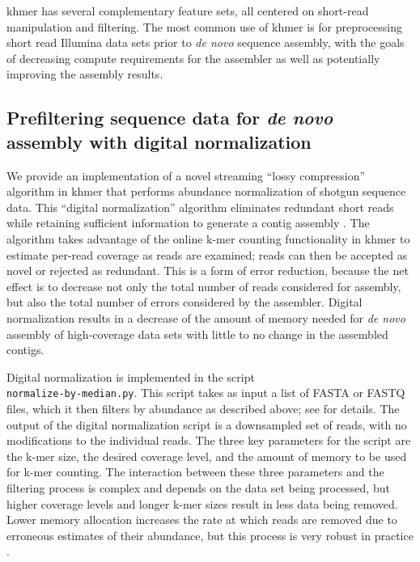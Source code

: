 \documentclass[10pt,a4paper]{article}
\begin{document}
khmer has several complementary feature sets, all centered on short-read
manipulation and filtering.  The most common use of khmer is for preprocessing
short read Illumina data sets prior to {\em de novo} sequence assembly, with the
goals of decreasing compute requirements for the assembler as well as potentially
improving the assembly results.

\subsection*{Prefiltering sequence data for {\em de novo} assembly with digital normalization}

We  provide an implementation of a novel streaming ``lossy compression'' algorithm in
khmer that performs abundance normalization of shotgun sequence data.
This ``digital normalization'' algorithm eliminates redundant
short reads while retaining sufficient information to generate a
contig assembly \cite{Brown2012}.  The algorithm takes advantage of the online
k-mer counting functionality in khmer to estimate per-read coverage as
reads are examined; reads can then be accepted as novel or rejected as
redundant. This is a form of error reduction, because the
net effect is to decrease not only the total number of reads considered
for assembly, but also the total number of errors considered
by the assembler.  Digital normalization results in a decrease of the
amount of memory needed for {\em de novo} assembly of high-coverage data sets
with little to no change in the assembled contigs.

Digital normalization is implemented in
the script \\
{\tt normalize-by-median.py}. 
This script takes as input a list of FASTA or FASTQ
files, which it then filters by abundance as described above; see \cite{diginorm} for details.  The output of the digital normalization script is a downsampled set of reads, with no modifications to the individual reads.  The three key parameters for the script are the k-mer size, the desired coverage level, and the amount of memory to be used for k-mer counting.  The interaction between these three parameters and the filtering process is complex and depends on the data set being processed, but higher coverage levels and longer k-mer sizes result in less data being removed.  Lower memory allocation increases the rate at which reads are removed due to erroneous estimates of their abundance, but this process is very robust in practice \cite{zhang2014}.   
\end{document}
